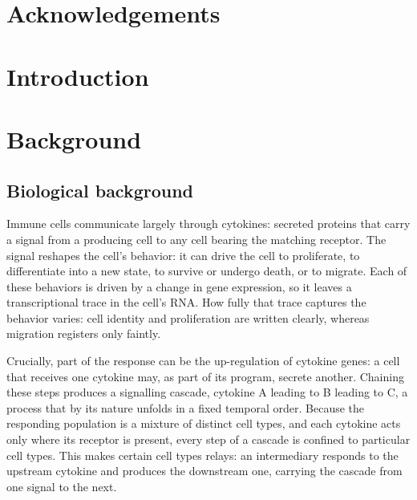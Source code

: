 \documentclass[11pt,a4paper]{article}
\begin{document}
\section*{Acknowledgements}

\newpage
\tableofcontents
\newpage

\setcounter{page}{1}

\section{Introduction}
\label{sec:introduction}

\section{Background}
\label{sec:background}

\subsection{Biological background}
Immune cells communicate largely through cytokines: secreted proteins that carry a signal from a producing cell to any cell bearing the matching receptor.
The signal reshapes the cell's behavior: it can drive the cell to proliferate, to differentiate into a new state, to survive or undergo death, or to migrate.
Each of these behaviors is driven by a change in gene expression, so it leaves a transcriptional trace in the cell's RNA. How fully that trace captures the behavior varies: cell identity and proliferation are written clearly, whereas migration registers only faintly.

Crucially, part of the response can be the up-regulation of cytokine genes: a cell that receives one cytokine may, as part of its program, secrete another.
Chaining these steps produces a signalling cascade, cytokine A leading to B leading to C, a process that by its nature unfolds in a fixed temporal order.
Because the responding population is a mixture of distinct cell types, and each cytokine acts only where its receptor is present, every step of a cascade is confined to particular cell types.
This makes certain cell types relays: an intermediary responds to the upstream cytokine and produces the downstream one, carrying the cascade from one signal to the next.
\end{document}

